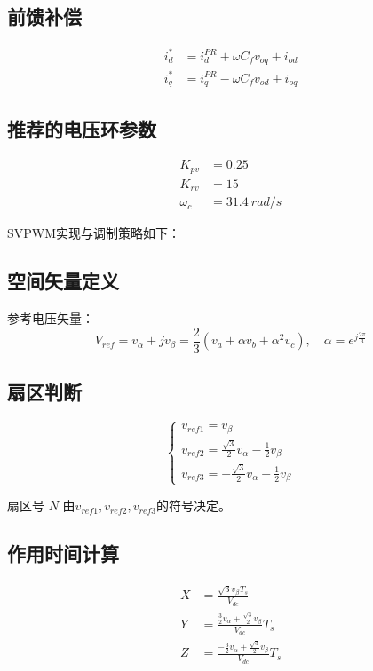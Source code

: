 \documentclass[11pt,a4paper]{article}
\begin{document}
\subsection{前馈补偿}
\begin{align}
i_d^* &= i_d^{PR} + \omega C_f v_{oq} + i_{od} \\
i_q^* &= i_q^{PR} - \omega C_f v_{od} + i_{oq}
\end{align}

\subsection{推荐的电压环参数}
\begin{align}
K_{pv} &= 0.25 \\
K_{rv} &= 15 \\
\omega_c &= \SI{31.4}{rad/s}
\end{align}

SVPWM实现与调制策略如下：

\subsection{空间矢量定义}
参考电压矢量：
\begin{equation}
V_{ref} = v_\alpha + j v_\beta = \frac{2}{3}(v_a + \alpha v_b + \alpha^2 v_c), \quad \alpha = e^{j\frac{2\pi}{3}}
\end{equation}

\subsection{扇区判断}
\begin{equation}
\begin{cases}
v_{ref1} = v_\beta \\
v_{ref2} = \frac{\sqrt{3}}{2}v_\alpha - \frac{1}{2}v_\beta \\
v_{ref3} = -\frac{\sqrt{3}}{2}v_\alpha - \frac{1}{2}v_\beta
\end{cases}
\end{equation}

扇区号 $N$ 由$v_{ref1}, v_{ref2}, v_{ref3}$的符号决定。

\subsection{作用时间计算}
\begin{align}
X &= \frac{\sqrt{3}v_\beta T_s}{V_{dc}} \\
Y &= \frac{\frac{3}{2}v_\alpha + \frac{\sqrt{3}}{2}v_\beta}{V_{dc}}T_s \\
Z &= \frac{-\frac{3}{2}v_\alpha + \frac{\sqrt{3}}{2}v_\beta}{V_{dc}}T_s
\end{align}
\end{document}
